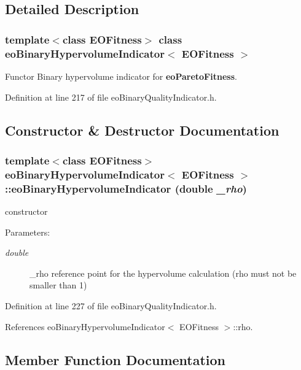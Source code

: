 \subsection{Detailed Description}
\subsubsection*{template$<$class EOFitness$>$ class eo\-Binary\-Hypervolume\-Indicator$<$ EOFitness $>$}

Functor Binary hypervolume indicator for {\bf eo\-Pareto\-Fitness}. 



Definition at line 217 of file eo\-Binary\-Quality\-Indicator.h.

\subsection{Constructor \& Destructor Documentation}
\subsubsection{\setlength{\rightskip}{0pt plus 5cm}template$<$class EOFitness$>$ {\bf eo\-Binary\-Hypervolume\-Indicator}$<$ EOFitness $>$::{\bf eo\-Binary\-Hypervolume\-Indicator} (double {\em \_\-rho})\hspace{0.3cm}{\tt  [inline]}}\label{classeoBinaryHypervolumeIndicator_8b1dedf93c1936ea7efa9b19913d8773}


constructor 

\begin{Desc}
\item[Parameters:]
\begin{description}
\item[{\em double}]\_\-rho reference point for the hypervolume calculation (rho must not be smaller than 1) \end{description}
\end{Desc}


Definition at line 227 of file eo\-Binary\-Quality\-Indicator.h.

References eo\-Binary\-Hypervolume\-Indicator$<$ EOFitness $>$::rho.

\subsection{Member Function Documentation}
